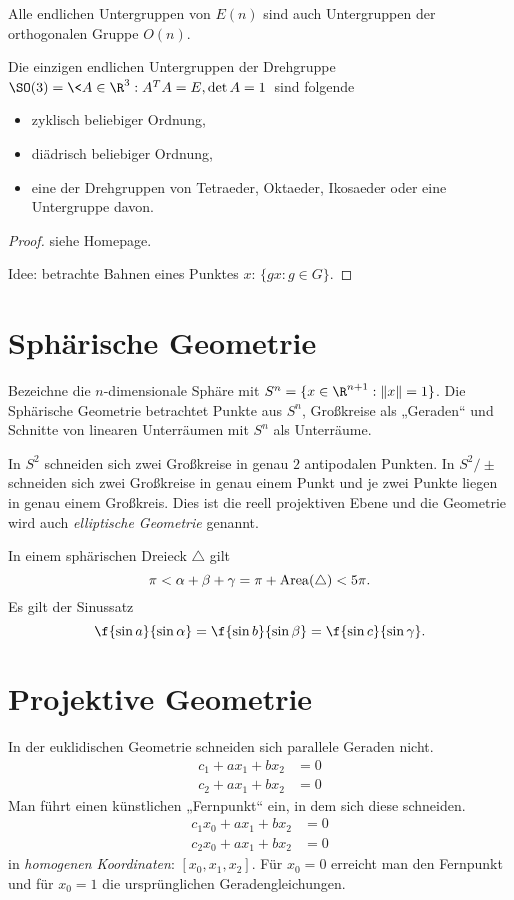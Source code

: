\begin{kor}
	Alle endlichen Untergruppen von $E(n)$ sind auch Untergruppen der orthogonalen Gruppe $O(n)$.
\end{kor}

\begin{st}
	Die einzigen endlichen Untergruppen der Drehgruppe $\SO (3) = \< A \in \R^3 : A^TA = E, \det A = 1 \>$ sind folgende
	\begin{itemize}
		\item
			zyklisch beliebiger Ordnung,
		\item
			diädrisch beliebiger Ordnung,
		\item
			eine der Drehgruppen von Tetraeder, Oktaeder, Ikosaeder oder eine Untergruppe davon.
	\end{itemize}
	\begin{proof}
		siehe Homepage.

		Idee: betrachte Bahnen eines Punktes $x$: $\{ gx : g \in G \}$.
	\end{proof}
\end{st}


\section{Sphärische Geometrie}


Bezeichne die $n$-dimensionale Sphäre mit $S^n = \{ x \in \R^{n+1} : \|x\| = 1 \}$.
Die Sphärische Geometrie betrachtet Punkte aus $S^n$, Großkreise als „Geraden“ und Schnitte von linearen Unterräumen mit $S^n$ als Unterräume.

In $S^2$ schneiden sich zwei Großkreise in genau $2$ antipodalen Punkten.
In $S^2 / \pm$ schneiden sich zwei Großkreise in genau einem Punkt und je zwei Punkte liegen in genau einem Großkreis.
Dies ist die reell projektiven Ebene und die Geometrie wird auch \emph{elliptische Geometrie} genannt.

In einem sphärischen Dreieck $\triangle$ gilt
\[
	\pi
	< \alpha + \beta + \gamma
	= \pi + \operatorname{Area}(\triangle)
	< 5 \pi.
\]
Es gilt der Sinussatz
\[
	\f {\sin a}{\sin \alpha}
	= \f {\sin b}{\sin \beta}
	= \f {\sin c}{\sin \gamma}.
\]



\section{Projektive Geometrie}


In der euklidischen Geometrie schneiden sich parallele Geraden nicht.
\begin{align*}
	c_1 + ax_1 + bx_2 &= 0 \\
	c_2 + ax_1 + bx_2 &= 0
\end{align*}
Man führt einen künstlichen „Fernpunkt“ ein, in dem sich diese schneiden.
\begin{align*}
	c_1 x_0 + a x_1 + b x_2 &= 0 \\
	c_2 x_0 + a x_1 + b x_2 &= 0
\end{align*}
in \emph{homogenen Koordinaten}: $[x_0, x_1, x_2]$.
Für $x_0 = 0$ erreicht man den Fernpunkt und für $x_0 = 1$ die ursprünglichen Geradengleichungen.


